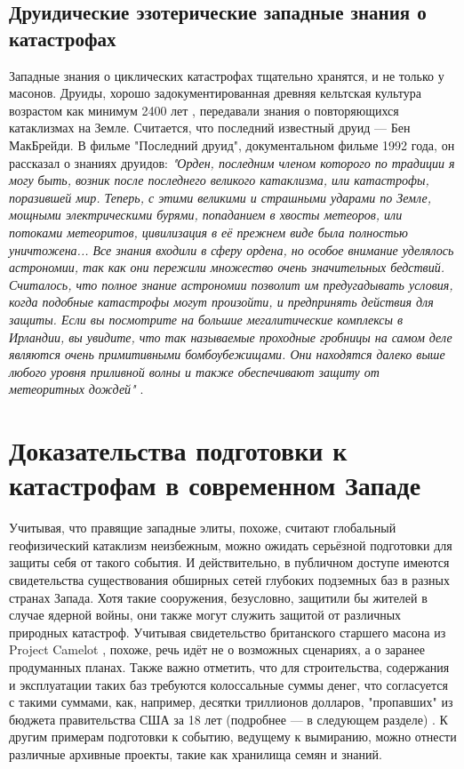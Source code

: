 \documentclass[10pt,twocolumn,letterpaper]{article}
\begin{document}
\subsection{Друидические эзотерические западные знания о катастрофах}

Западные знания о циклических катастрофах тщательно хранятся, и не только у масонов. Друиды, хорошо задокументированная древняя кельтская культура возрастом как минимум 2400 лет \cite{7}, передавали знания о повторяющихся катаклизмах на Земле. Считается, что последний известный друид — Бен МакБрейди. В фильме "Последний друид", документальном фильме 1992 года, он рассказал о знаниях друидов: \textit{"Орден, последним членом которого по традиции я могу быть, возник после последнего великого катаклизма, или катастрофы, поразившей мир. Теперь, с этими великими и страшными ударами по Земле, мощными электрическими бурями, попаданием в хвосты метеоров, или потоками метеоритов, цивилизация в её прежнем виде была полностью уничтожена... Все знания входили в сферу ордена, но особое внимание уделялось астрономии, так как они пережили множество очень значительных бедствий. Считалось, что полное знание астрономии позволит им предугадывать условия, когда подобные катастрофы могут произойти, и предпринять действия для защиты. Если вы посмотрите на большие мегалитические комплексы в Ирландии, вы увидите, что так называемые проходные гробницы на самом деле являются очень примитивными бомбоубежищами. Они находятся далеко выше любого уровня приливной волны и также обеспечивают защиту от метеоритных дождей"} \cite{8,9}.


\section{Доказательства подготовки к катастрофам в современном Западе}

Учитывая, что правящие западные элиты, похоже, считают глобальный геофизический катаклизм неизбежным, можно ожидать серьёзной подготовки для защиты себя от такого события. И действительно, в публичном доступе имеются свидетельства существования обширных сетей глубоких подземных баз в разных странах Запада. Хотя такие сооружения, безусловно, защитили бы жителей в случае ядерной войны, они также могут служить защитой от различных природных катастроф. Учитывая свидетельство британского старшего масона из Project Camelot \cite{4,6}, похоже, речь идёт не о возможных сценариях, а о заранее продуманных планах. Также важно отметить, что для строительства, содержания и эксплуатации таких баз требуются колоссальные суммы денег, что согласуется с такими суммами, как, например, десятки триллионов долларов, "пропавших" из бюджета правительства США за 18 лет (подробнее — в следующем разделе) \cite{11,12,13}. К другим примерам подготовки к событию, ведущему к вымиранию, можно отнести различные архивные проекты, такие как хранилища семян и знаний.
\end{document}
